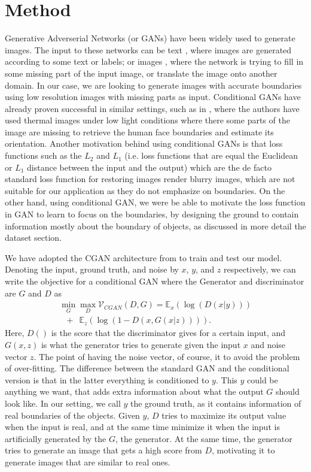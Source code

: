\section{ Method}
Generative Adverserial Networks (or GANs) \cite{GAN} have been widely used to generate images. The input to these networks can be text \cite{text2pix, text2pix2}, where images are generated according to some text or labels; or images \cite{pix2pix, cGANberkeley, TV-GAN, deraning}, where the network is trying to fill in some missing part of the input image, or translate the image onto another domain. In our case, we are looking to generate images with accurate boundaries using low resolution images with missing parts as input. Conditional GANs have already proven successful in similar settings, such as in \cite{hams, TV-GAN}, where the authors have used thermal images under low light conditions where there some parts of the image are missing to retrieve the human face boundaries and estimate its orientation. Another motivation behind using conditional GANs is that loss functions such as the $L_2$ and $L_1$ (i.e. loss functions that are equal the Euclidean or $L_1$ distance between the input and the output) which are the de facto standard loss function for restoring images render blurry images, which are not suitable for our application as they do not emphasize on boundaries. On the other hand, using conditional GAN, we were be able to motivate the loss function in GAN to learn to focus on the boundaries, by designing the ground to contain information mostly about the boundary of objects, as discussed in more detail the dataset section.
	
We have adopted the CGAN architecture from \cite{pix2pix} to train and test our model. Denoting the input, ground truth, and noise by $x$, $y$, and $z$ respectively, we can write the objective for a conditional GAN where the Generator and discriminator are $G$ and $D$ as
\begin{equation}
\begin{array}{l}
\min_G \max_D \mathcal{V}_{CGAN}(D,G) = \mathbb{E}_{x}(\log(D(x|y)))\\
\, \, \, \,+ \, \, \, \mathbb{E}_{z}(\log(1-D(x,G(x|z)))).
\end{array}
\end{equation}
Here, $D()$ is the score that the discriminator gives for a certain input, and $G(x,z)$ is what the generator tries to generate given the input $x$ and noise vector $z$. The point of having the noise vector, of course, it to avoid the problem of over-fitting. The difference between the standard GAN and the conditional version is that in the latter everything is conditioned to $y$. This $y$ could be anything we want, that adds extra information about what the output $G$ should look like. In our setting, we call $y$ the ground truth, as it contains information of real boundaries of the objects. Given $y$, $D$ tries to maximize its output value when the input is real, and at the same time minimize it when the input is artificially generated by the $G$, the generator. At the same time, the generator tries to generate an image that gets a high score from $D$, motivating it to generate images that are similar to real ones.

